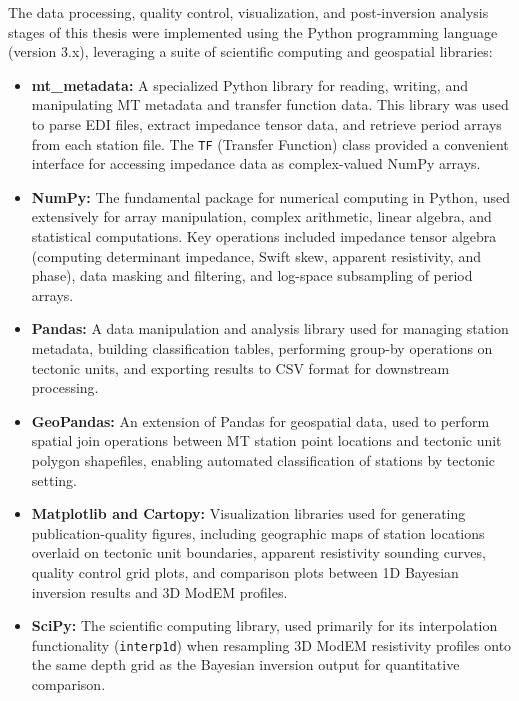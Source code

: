 The data processing, quality control, visualization, and post-inversion analysis stages of this thesis were implemented using the Python programming language (version 3.x), leveraging a suite of scientific computing and geospatial libraries:

\begin{itemize}
    \item \textbf{mt\_metadata:} A specialized Python library for reading, writing, and manipulating MT metadata and transfer function data. This library was used to parse EDI files, extract impedance tensor data, and retrieve period arrays from each station file. The \texttt{TF} (Transfer Function) class provided a convenient interface for accessing impedance data as complex-valued NumPy arrays.

    \item \textbf{NumPy:} The fundamental package for numerical computing in Python, used extensively for array manipulation, complex arithmetic, linear algebra, and statistical computations. Key operations included impedance tensor algebra (computing determinant impedance, Swift skew, apparent resistivity, and phase), data masking and filtering, and log-space subsampling of period arrays.

    \item \textbf{Pandas:} A data manipulation and analysis library used for managing station metadata, building classification tables, performing group-by operations on tectonic units, and exporting results to CSV format for downstream processing.

    \item \textbf{GeoPandas:} An extension of Pandas for geospatial data, used to perform spatial join operations between MT station point locations and tectonic unit polygon shapefiles, enabling automated classification of stations by tectonic setting.

    \item \textbf{Matplotlib and Cartopy:} Visualization libraries used for generating publication-quality figures, including geographic maps of station locations overlaid on tectonic unit boundaries, apparent resistivity sounding curves, quality control grid plots, and comparison plots between 1D Bayesian inversion results and 3D ModEM profiles.

    \item \textbf{SciPy:} The scientific computing library, used primarily for its interpolation functionality (\texttt{interp1d}) when resampling 3D ModEM resistivity profiles onto the same depth grid as the Bayesian inversion output for quantitative comparison.


\end{itemize}
